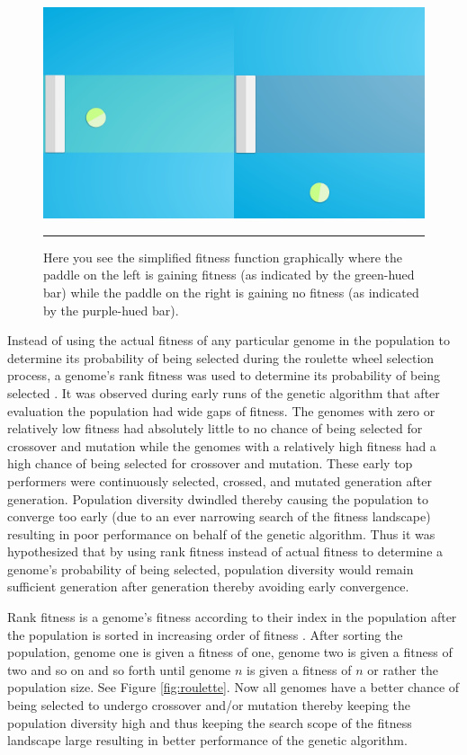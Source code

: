 \begin{figure}[htbp]  
  \centering
  \includegraphics[scale=0.3]{../Figures/Chapter3/simple_fit_func.png}
  \rule{35em}{0.5pt}
  \caption[Simplified Fitness Function]{Here you see the simplified fitness function graphically where the paddle on the left is gaining fitness (as indicated by the green-hued bar) while the paddle on the right is gaining no fitness (as indicated by the purple-hued bar).}
  \label{fig:simple_fit_func}
\end{figure}

Instead of using the actual fitness of any particular genome in the population to determine its probability of being selected during the roulette wheel selection process, a genome's rank fitness was used to determine its probability of being selected \cite{geneticalgorithm}. It was observed during early runs of the genetic algorithm that after evaluation the population had wide gaps of fitness. The genomes with zero or relatively low fitness had absolutely little to no chance of being selected for crossover and mutation while the genomes with a relatively high fitness had a high chance of being selected for crossover and mutation. These early top performers were continuously selected, crossed, and mutated generation after generation. Population diversity dwindled thereby causing the population to converge too early (due to an ever narrowing search of the fitness landscape) resulting in poor performance on behalf of the genetic algorithm. Thus it was hypothesized that by using rank fitness instead of actual fitness to determine a genome's probability of being selected, population diversity would remain sufficient generation after generation thereby avoiding early convergence. 

Rank fitness is a genome's fitness according to their index in the population after the population is sorted in increasing order of fitness \cite{genselect}. After sorting the population, genome one is given a fitness of one, genome two is given a fitness of two and so on and so forth until genome $n$ is given a fitness of $n$ or rather the population size. See Figure \ref{fig:roulette}. Now all genomes have a better chance of being selected to undergo crossover and/or mutation thereby keeping the population diversity high and thus keeping the search scope of the fitness landscape large resulting in better performance of the genetic algorithm.   

